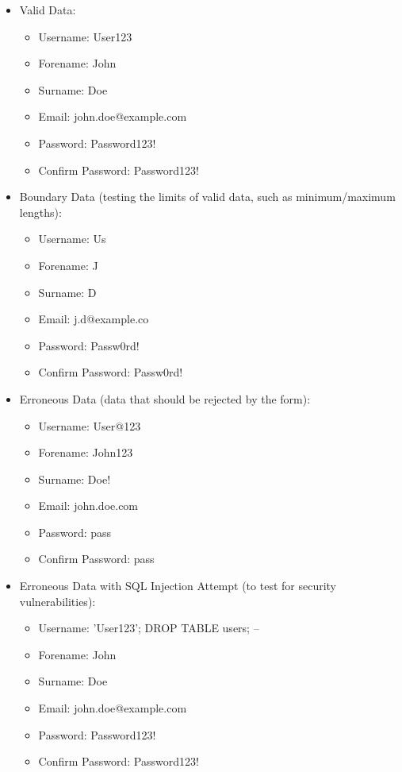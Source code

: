 \documentclass{article}
\begin{document}
\begin{itemize}
  \item Valid Data:
  \begin{itemize}
    \item Username: User123
    \item Forename: John
    \item Surname: Doe
    \item Email: john.doe@example.com
    \item Password: Password123!
    \item Confirm Password: Password123!
  \end{itemize}
  \item Boundary Data (testing the limits of valid data, such as minimum/maximum lengths):
  \begin{itemize}
    \item Username: Us
    \item Forename: J 
    \item Surname: D
    \item Email: j.d@example.co
    \item Password: Passw0rd!
    \item Confirm Password: Passw0rd!
  \end{itemize}
  \item Erroneous Data (data that should be rejected by the form):
  \begin{itemize}
    \item Username: User@123
    \item Forename: John123
    \item Surname: Doe!
    \item Email: john.doe.com
    \item Password: pass
    \item Confirm Password: pass
  \end{itemize}
  \item Erroneous Data with SQL Injection Attempt (to test for security vulnerabilities):
  \begin{itemize}
    \item Username: 'User123'; DROP TABLE users; --
    \item Forename: John
    \item Surname: Doe
    \item Email: john.doe@example.com
    \item Password: Password123!
    \item Confirm Password: Password123!
  \end{itemize}
\end{itemize}
\end{document}
